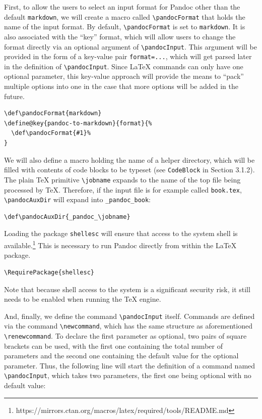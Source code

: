 \documentclass[
  digital,     %
  oneside,     %
  nosansbold,  %
  nocolorbold, %
  lof,         %
  nolot,       %
]{fithesis4}
\newcommand\macro[1]{\texttt{\textbackslash{}{#1}}}
\begin{document}
First, to allow the users to select an input format for Pandoc other than the default \texttt{markdown}, we will create a macro called \macro{pandocFormat} that holds the name of the input format. By default, \macro{pandocFormat} is set to \texttt{markdown}. It is also associated with the ``key'' format, which will allow users to change the format directly via an optional argument of \macro{pandocInput}. This argument will be provided in the form of a key-value pair \texttt{format=...}, which will get parsed later in the definition of \macro{pandocInput}. Since \LaTeX{} commands can only have one optional parameter, this key-value approach will provide the means to ``pack'' multiple options into one in the case that more options will be added in the future.

\noindent
\lstset{language=[LaTeX]TeX}
\begin{lstlisting}
\def\pandocFormat{markdown}
\define@key{pandoc-to-markdown}{format}{%
  \def\pandocFormat{#1}%
}
\end{lstlisting}

\noindent
We will also define a macro holding the name of a helper directory, which will be filled with contents of code blocks to be typeset (see \texttt{CodeBlock} in Section 3.1.2). The plain \TeX{} primitive \macro{jobname} expands to the name of the top file being processed by \TeX{}. Therefore, if the input file is for example called \texttt{book.tex}, \macro{pandocAuxDir} will expand into \texttt{\_pandoc\_book}:

\noindent
\lstset{language=[LaTeX]TeX}
\begin{lstlisting}
\def\pandocAuxDir{_pandoc_\jobname}
\end{lstlisting}

\noindent
Loading the package \texttt{shellesc} will ensure that access to the system shell is available.\footnote{https://mirrors.ctan.org/macros/latex/required/tools/README.md} This is necessary to run Pandoc directly from within the \LaTeX{} package.

\noindent
\lstset{language=[LaTeX]TeX}
\begin{lstlisting}
\RequirePackage{shellesc}
\end{lstlisting}

\noindent
Note that because shell access to the system is a significant security risk, it still needs to be enabled when running the \TeX{} engine.

And, finally, we define the command \macro{pandocInput} itself. Commands are defined via the command \macro{newcommand}, which has the same structure as aforementioned \macro{renewcommand}. To declare the first parameter as optional, two pairs of square brackets can be used, with the first one containing the total number of parameters and the second one containing the default value for the optional parameter. Thus, the following line will start the definition of a command named \macro{pandocInput}, which takes two parameters, the first one being optional with no default value:
\end{document}
